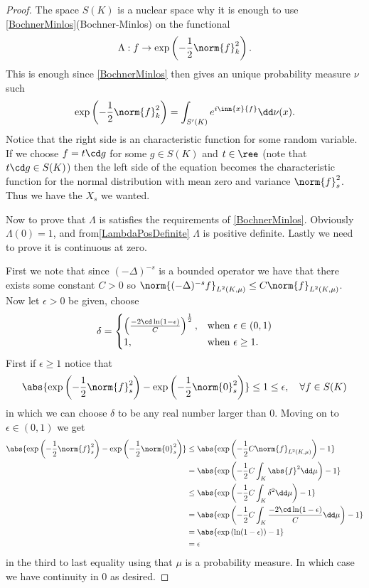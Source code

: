 \begin{proof}
	The space $S(K)$ is a nuclear space why it is enough to use \cref{BochnerMinlos}(Bochner-Minlos) on the functional
	\begin{equation}
		\Lambda : f \to \exp\left(-\frac{1}{2} \norm{f}^2_{k}\right).
	\end{equation}
	This is enough since \cref{BochnerMinlos} then gives an unique probability measure $\nu$ such
	\begin{equation}
		\exp \left(-\frac{1}{2} \norm{f}^{2}_{k}\right) = \int_{S'(K)} e^{i \inn{x}{f}} \dd \nu (x).
	\end{equation}
	Notice that the right side is an characteristic function for some random variable. If we choose $f= t\cd g$ for some $g \in S(K)$ and $t \in \ree$ (note that $t \cd g \in S(K)$) then the left side of the equation becomes the characteristic function for the normal distribution with mean zero and variance $\norm{f}_{s}^{2}$. Thus we have the $X_s$ we wanted.
	
	
	Now to prove that $\Lambda$ is satisfies the requirements of \cref{BochnerMinlos}. Obviously $\Lambda(0) = 1$, and from\cref{LambdaPosDefinite} $\Lambda$ is positive definite. Lastly we need to prove it is continuous at zero. 
	
	First we note that since $(-\Delta)^{-s}$ is a bounded operator we have that there exists some constant $C> 0$ so $\norm{(-\Delta)^{-s}f }_{L^{2}(K, \mu)} \leq C \norm{f}_{L^{2}(K, \mu)}$. Now let $\epsilon > 0$ be given, choose $$\delta = \begin{cases}
		\left(\frac{-2\cd \ln(1-\epsilon)}{C}\right)^{\frac{1}{2}}, & \text{when } \epsilon \in (0,1) \\
		1,& \text{when } \epsilon \geq 1.
	\end{cases}$$
	First if $\epsilon \geq 1$ notice that 
	\begin{equation}
		\abs{\exp\left(-\frac{1}{2} \norm{f}_{s}^{2}\right) - \exp\left(-\frac{1}{2} \norm{0}_{s}^{2}\right)} \leq 1 \leq \epsilon, \quad \forall f \in S(K)
	\end{equation} 
	in which we can choose $\delta$ to be any real number larger than $0$. Moving on to $\epsilon \in (0,1)$ we get
	\begin{align}
		\abs{\exp\left(-\frac{1}{2} \norm{f}_{s}^{2}\right) - \exp\left(-\frac{1}{2} \norm{0}_{s}^{2}\right)} &\leq \abs{\exp\left(-\frac{1}{2} C\norm{f}_{L^2(K,\mu)}\right) - 1} \\
		&= \abs{\exp\left(-\frac{1}{2} C \int_{K}\abs{f}^2 \dd \mu\right) - 1} \\
		&\leq \abs{\exp\left(-\frac{1}{2} C \int_{K} \delta^2 \dd \mu\right) - 1} \\
		&= \abs{\exp\left(-\frac{1}{2} C \int_{K} \frac{-2\cd \ln(1-\epsilon)}{ C} \dd \mu\right) - 1}  \\
		&= \abs{\exp\left(\ln(1-\epsilon)\right) -1}\\
		& = \epsilon
	\end{align}
	in the third to last equality using that $\mu$ is a probability measure. In which case we have continuity in $0$ as desired.
\end{proof}


